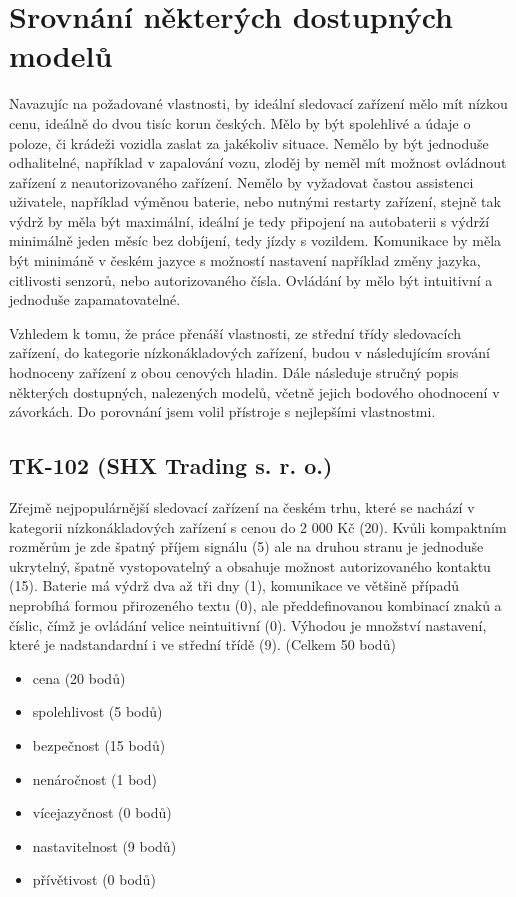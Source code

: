 \documentclass[FM,BP]{tulthesis}  %
\begin{document}
\section{Srovnání některých dostupných modelů}
Navazujíc na požadované vlastnosti, by ideální sledovací zařízení mělo mít nízkou cenu, ideálně do dvou tisíc korun českých. Mělo by být spolehlivé a údaje o poloze, či krádeži vozidla zaslat za jakékoliv situace. Nemělo by být jednoduše odhalitelné, například v zapalování vozu, zloděj by neměl mít možnost ovládnout zařízení z neautorizovaného zařízení. Nemělo by vyžadovat častou assistenci uživatele, například výměnou baterie, nebo nutnými restarty zařízení, stejně tak výdrž by měla být maximální, ideální je tedy připojení na autobaterii s výdrží minimálně jeden měsíc bez dobíjení, tedy jízdy s vozildem. Komunikace by měla být minimáně v českém jazyce s možností nastavení například změny jazyka, citlivosti senzorů, nebo autorizovaného čísla. Ovládání by mělo být intuitivní a jednoduše zapamatovatelné.

Vzhledem k tomu, že práce přenáší vlastnosti, ze střední třídy sledovacích zařízení, do kategorie nízkonákladových zařízení, budou v následujícím srování hodnoceny zařízení z obou cenových hladin. Dále následuje stručný popis některých dostupných, nalezených modelů, včetně jejich bodového ohodnocení v závorkách. Do porovnání jsem volil přístroje s nejlepšími vlastnostmi.

\subsection{TK-102 (SHX Trading s. r. o.)}
Zřejmě nejpopulárnější sledovací zařízení na českém trhu, které se nachází v kategorii nízkonákladových zařízení s cenou do 2 000 Kč (20). Kvůli kompaktním rozměrům je zde špatný příjem signálu (5) ale na druhou stranu je jednoduše ukrytelný, špatně vystopovatelný a obsahuje možnost autorizovaného kontaktu (15). Baterie má výdrž dva až tři dny (1), komunikace ve většině případů neprobíhá formou přirozeného textu (0), ale předdefinovanou kombinací znaků a číslic, čímž je ovládání velice neintuitivní (0). Výhodou je množství nastavení, které je nadstandardní i ve střední třídě (9). (Celkem 50 bodů)

\begin{itemize}
\item cena (20 bodů)
\item spolehlivost (5 bodů)
\item bezpečnost (15 bodů)
\item nenáročnost (1 bod)
\item vícejazyčnost (0 bodů)
\item nastavitelnost (9 bodů)
\item přívětivost (0 bodů)
\end{itemize}
\end{document}
